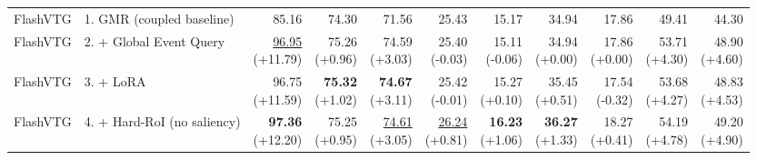 \documentclass{article}
\begin{document}
{\begin{tabular}{llrrrrrrrrr}
\midrule
FlashVTG & 1. GMR (coupled baseline) & 85.16 & 74.30 & 71.56 & 25.43 & 15.17 & 34.94 & 17.86 & 49.41 & 44.30 \\
FlashVTG & 2. + Global Event Query & \shortstack{\underline{96.95} \\ {\scriptsize (+11.79)}} & \shortstack{75.26 \\ {\scriptsize (+0.96)}} & \shortstack{74.59 \\ {\scriptsize (+3.03)}} & \shortstack{25.40 \\ {\scriptsize (-0.03)}} & \shortstack{15.11 \\ {\scriptsize (-0.06)}} & \shortstack{34.94 \\ {\scriptsize (+0.00)}} & \shortstack{17.86 \\ {\scriptsize (+0.00)}} & \shortstack{53.71 \\ {\scriptsize (+4.30)}} & \shortstack{48.90 \\ {\scriptsize (+4.60)}} \\
FlashVTG & 3. + LoRA & \shortstack{96.75 \\ {\scriptsize (+11.59)}} & \shortstack{\textbf{75.32} \\ {\scriptsize (+1.02)}} & \shortstack{\textbf{74.67} \\ {\scriptsize (+3.11)}} & \shortstack{25.42 \\ {\scriptsize (-0.01)}} & \shortstack{15.27 \\ {\scriptsize (+0.10)}} & \shortstack{35.45 \\ {\scriptsize (+0.51)}} & \shortstack{17.54 \\ {\scriptsize (-0.32)}} & \shortstack{53.68 \\ {\scriptsize (+4.27)}} & \shortstack{48.83 \\ {\scriptsize (+4.53)}} \\
FlashVTG & 4. + Hard-RoI (no saliency) & \shortstack{\textbf{97.36} \\ {\scriptsize (+12.20)}} & \shortstack{75.25 \\ {\scriptsize (+0.95)}} & \shortstack{\underline{74.61} \\ {\scriptsize (+3.05)}} & \shortstack{\underline{26.24} \\ {\scriptsize (+0.81)}} & \shortstack{\textbf{16.23} \\ {\scriptsize (+1.06)}} & \shortstack{\textbf{36.27} \\ {\scriptsize (+1.33)}} & \shortstack{18.27 \\ {\scriptsize (+0.41)}} & \shortstack{54.19 \\ {\scriptsize (+4.78)}} & \shortstack{49.20 \\ {\scriptsize (+4.90)}} \\

\end{tabular}}
\end{document}

